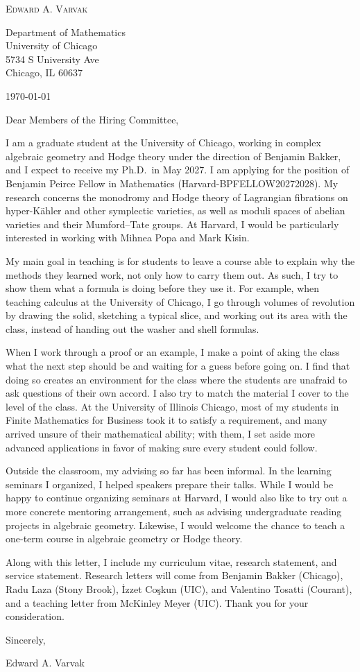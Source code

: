 \documentclass[12pt]{article}
\begin{document}
\begin{center}
  {\Large\textsc{Edward A. Varvak}}\\[10pt]
\end{center}

Department of Mathematics \\
University of Chicago \\
5734 S University Ave \\
Chicago, IL 60637

\today

Dear Members of the Hiring Committee,

I am a graduate student at the University of Chicago, working in complex
algebraic geometry and Hodge theory under the direction of Benjamin Bakker,
and I expect to receive my Ph.D.\ in May 2027. I am applying for the position
of Benjamin Peirce Fellow in Mathematics (\mbox{Harvard-BPFELLOW20272028}).
My research concerns the monodromy and Hodge theory of Lagrangian fibrations
on hyper-K\"ahler and other symplectic varieties, as well as moduli spaces of
abelian varieties and their Mumford--Tate groups. At Harvard, I would be
particularly interested in working with Mihnea Popa and Mark Kisin.

My main goal in teaching is for students to leave a course able to explain
why the methods they learned work, not only how to carry them out. As such, I try
to show them what a formula is doing before they use it. For example, when 
teaching calculus at the University of Chicago, I go through volumes of revolution
by drawing the solid, sketching a typical slice, and working out its
area with the class, instead of handing out the washer and shell formulas.

When I work through a proof or an example, I make a point of
aking the class what the next step should be and waiting for a guess before going on. 
I find that doing so creates an environment for the class where the students are 
unafraid to ask questions of their own accord.
I also try to match the material I cover to the level of the class. 
At the University of Illinois Chicago, most of my students in
Finite Mathematics for Business took it to satisfy a requirement, and many
arrived unsure of their mathematical ability; with them, I set
aside more advanced applications in favor of making sure every student could
follow.

Outside the classroom, my advising so far has been informal. In the learning seminars 
I organized, I helped speakers prepare their talks. While I would be happy to continue 
organizing seminars at Harvard, I would also like to try out a
more concrete mentoring arrangement, such as advising undergraduate reading projects 
in algebraic geometry. Likewise, I would welcome the chance to teach a one-term 
course in algebraic geometry or Hodge theory.

Along with this letter, I include my curriculum vitae, research statement,
and service statement. Research letters will come from Benjamin Bakker
(Chicago), Radu Laza (Stony Brook), \.{I}zzet Co\c{s}kun (UIC), and Valentino
Tosatti (Courant), and a teaching letter from McKinley Meyer (UIC). Thank you
for your consideration.

Sincerely,

Edward A. Varvak
\end{document}
